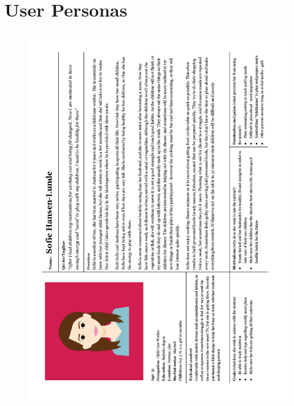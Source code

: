 \section{User Personas}
    \label{Userpersona}
     \begin{figure}[H]
        \centering
        \includegraphics[scale=0.7]{figures/fempers.png}
    \end{figure}
